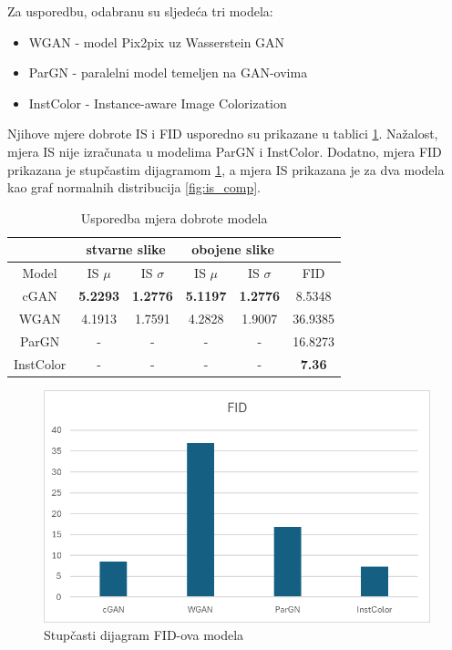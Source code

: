 
Za usporedbu, odabranu su sljedeća tri modela:

\begin{itemize}
    \item WGAN - model Pix2pix uz Wasserstein GAN\cite{pix2pixwgan}
    \item ParGN - paralelni model temeljen na GAN-ovima\cite{kumar2022paracolorizer} 
    \item InstColor - Instance-aware Image Colorization\cite{Su_2020_CVPR}
\end{itemize}

Njihove mjere dobrote IS i FID usporedno su prikazane u tablici \ref{table:usporedne_mjere}. Nažalost, mjera IS nije izračunata u modelima ParGN\cite{kumar2022paracolorizer} i InstColor\cite{Su_2020_CVPR}. Dodatno, mjera FID prikazana je stupčastim dijagramom \ref{fig:fid_comp}, a mjera IS prikazana je za dva modela kao graf normalnih distribucija \ref{fig:is_comp}.

\begin{table}[H]
    \centering
    \caption{Usporedba mjera dobrote modela}
    \label{table:usporedne_mjere}
    \begin{tabular}{ |c|c|c|c|c|c| }
        \hline
         & \multicolumn{2}{|c|}{stvarne slike} & \multicolumn{2}{|c|}{obojene slike} &  \\
        \hline
        Model & IS $\mu$ & IS $\sigma$ & IS $\mu$ & IS $\sigma$ & FID \\
        \hline
        \hline
        cGAN & \textbf{5.2293} & \textbf{1.2776} & \textbf{5.1197} & \textbf{1.2776} & 8.5348 \\
        \hline
        WGAN\cite{pix2pixwgan} & 4.1913 & 1.7591 & 4.2828 & 1.9007 & 36.9385 \\
        \hline
        ParGN\cite{kumar2022paracolorizer} & - & - & - & - & 16.8273 \\
        \hline
        InstColor\cite{Su_2020_CVPR} & - & - & - & - & \textbf{7.36} \\
        \hline
    \end{tabular}
\end{table}


\begin{figure}
    \centering
    \includegraphics[width=0.75\linewidth]{imgs/fid_corrected.png}
    \caption{Stupčasti dijagram FID-ova modela}
    \label{fig:fid_comp}
\end{figure}



